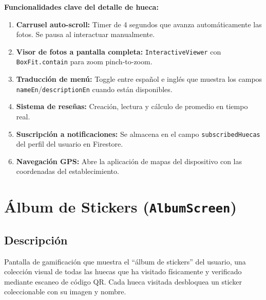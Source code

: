 \documentclass[11pt, a4paper, oneside]{report}
\begin{document}
\begin{funcbox}
\textbf{Funcionalidades clave del detalle de hueca:}
\begin{enumerate}
  \item \textbf{Carrusel auto-scroll:} Timer de 4 segundos que avanza automáticamente las fotos. Se pausa al interactuar manualmente.
  \item \textbf{Visor de fotos a pantalla completa:} \texttt{InteractiveViewer} con \texttt{BoxFit.contain} para zoom pinch-to-zoom.
  \item \textbf{Traducción de menú:} Toggle entre español e inglés que muestra los campos \texttt{nameEn}/\texttt{descriptionEn} cuando están disponibles.
  \item \textbf{Sistema de reseñas:} Creación, lectura y cálculo de promedio en tiempo real.
  \item \textbf{Suscripción a notificaciones:} Se almacena en el campo \texttt{subscribedHuecas} del perfil del usuario en Firestore.
  \item \textbf{Navegación GPS:} Abre la aplicación de mapas del dispositivo con las coordenadas del establecimiento.
\end{enumerate}
\end{funcbox}

\section{Álbum de Stickers (\texttt{AlbumScreen})}

\subsection{Descripción}
Pantalla de gamificación que muestra el ``álbum de stickers'' del usuario, una colección visual de todas las huecas que ha visitado físicamente y verificado mediante escaneo de código QR. Cada hueca visitada desbloquea un sticker coleccionable con su imagen y nombre.
\end{document}

